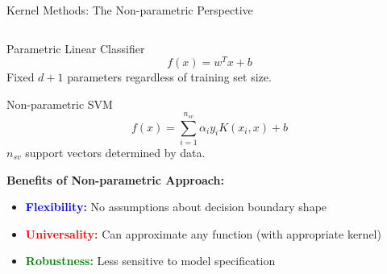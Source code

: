\documentclass[8pt,aspectratio=1610]{beamer}
\begin{document}
\begin{frame}{Kernel Methods: The Non-parametric Perspective}
\begin{columns}[t]
\begin{column}{0.48\textwidth}
\begin{block}{Parametric Linear Classifier}
$$f(x) = w^T x + b$$
Fixed $d+1$ parameters regardless of training set size.
\end{block}

\vspace{0.3cm}
\begin{block}{Non-parametric SVM}
$$f(x) = \sum_{i=1}^{n_{sv}} \alpha_i y_i K(x_i, x) + b$$
$n_{sv}$ support vectors determined by data.
\end{block}

\vspace{0.3cm}
\textbf{Benefits of Non-parametric Approach:}
\begin{itemize}
\setlength{\itemsep}{1pt}
\item \textcolor{blue}{\textbf{Flexibility:}} No assumptions about decision boundary shape
\item \textcolor{red}{\textbf{Universality:}} Can approximate any function (with appropriate kernel)
\item \textcolor{green}{\textbf{Robustness:}} Less sensitive to model specification
\end{itemize}
\end{column}
\end{columns}
\end{frame}
\end{document}
